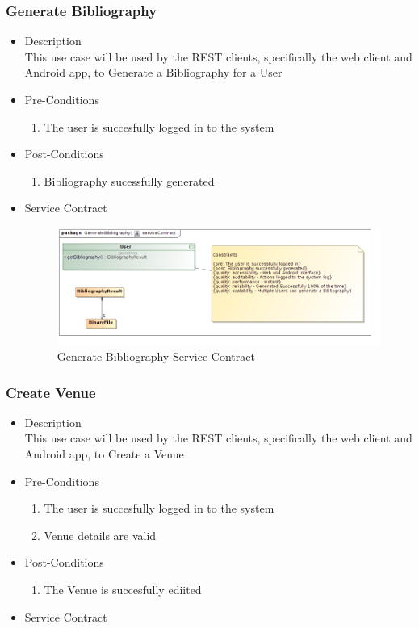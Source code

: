 \documentclass[a4paper,10pt]{article}
\begin{document}
\subsubsection{Generate Bibliography}
	\begin{itemize}
		\item Description\\
			This use case will be used by the REST clients, specifically the web client and Android app, to Generate a Bibliography for a User
		\item Pre-Conditions
			\begin{enumerate}
				\item The user is succesfully logged in to the system
			\end{enumerate}
		\item Post-Conditions
			\begin{enumerate}
				\item Bibliography sucessfully generated
						
			\end{enumerate}
		\item Service Contract
			\begin{figure}[H]
				\includegraphics[scale=0.5]{generateBibliography}
				\caption{Generate Bibliography Service Contract}
			\end{figure}
	\end{itemize}


\subsubsection{Create Venue}
	\begin{itemize}
		\item Description\\
			This use case will be used by the REST clients, specifically the web client and Android app, to Create a Venue
		\item Pre-Conditions
			\begin{enumerate}
				\item The user is succesfully logged in to the system
				\item Venue details are valid
			\end{enumerate}
		\item Post-Conditions
			\begin{enumerate}
				\item The Venue is succesfully ediited
						
			\end{enumerate}
		\item Service Contract
	\end{itemize}
\end{document}
